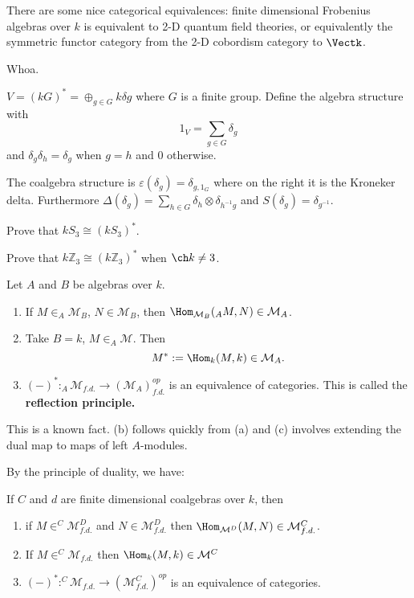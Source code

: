 \documentclass[12pt]{article}
\newcommand*{\Z}{
\mathbb{Z}
}
\begin{document}
There are some nice categorical equivalences: finite dimensional Frobenius algebras over $k$ is
equivalent to 2-D quantum field theories, or equivalently the symmetric functor category from the 2-D cobordism category to $\Vectk$.

Whoa.

\begin{ex}
	$V=(kG)^*=\oplus_{g\in G}k\delta g$ where $G$ is a finite group. Define the algebra structure with
	\[1_V=\sum_{g\in G}\delta_g\]
	and $\delta_g\delta_h=\delta_g$ when $g=h$ and 0 otherwise.

	The coalgebra structure is $\varepsilon(\delta_g)=\delta_{g,1_G}$ where on the right it is the Kroneker delta.
	Furthermore $\Delta(\delta_g)=\sum_{h\in G}\delta_h\otimes\delta_{h^{-1}g}$ and $S(\delta_g)=\delta_{g^{-1}}$.
\end{ex}

\begin{prob}
	Prove that $kS_3\cong(kS_3)^*$.
\end{prob}
\begin{prob}
	Prove that $k\Z_3\cong(k\Z_3)^*$ when $\ch k\ne 3$.
\end{prob}

\begin{lem}
	Let $A$ and $B$ be algebras over $k$.
	\begin{enumerate}
		\item If $M\in_A\mathcal{M}_B$, $N\in \mathcal{M}_B$, then $\Hom_{\mathcal{M}_B}(_AM,N)\in\mathcal{M}_A$.
		\item Take $B=k$, $M\in _A\mathcal{M}$. Then
		\[M^*:=\Hom_k(M,k)\in\mathcal{M}_A.\]
		\item $(-)^*:_A\mathcal{M}_{f.d.}\to (\mathcal{M}_A)_{f.d.}^{op}$ is an equivalence of categories. This is called the \textbf{reflection principle.}
	\end{enumerate}
\end{lem}
\begin{prf}
	This is a known fact. (b) follows quickly from (a) and (c) involves extending the dual map to maps of left $A$-modules.
\end{prf}
By the principle of duality, we have:
\begin{lem}
	If $C$ and $d$ are finite dimensional coalgebras over $k$, then
	\begin{enumerate}
		\item if $M\in ^C\mathcal{M}^D_{f.d.}$ and $N\in \mathcal{M}^D_{f.d.}$ then $\Hom_{\mathcal{M}^D}(M,N)\in\mathcal{M}^C_{f.d.}$.
		\item If $M\in ^C\mathcal{M}_{f.d.}$ then $\Hom_k(M,k)\in\mathcal{M}^C$
		\item $(-)^*:^C\mathcal{M}_{f.d.}\to(\mathcal{M}_{f.d.}^C)^{op}$ is an equivalence of categories.
	\end{enumerate}
\end{lem}
\end{document}
